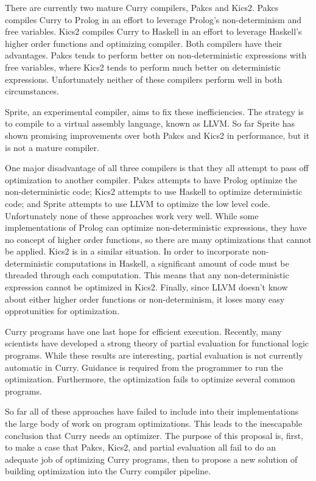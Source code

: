 There are currently two mature Curry compilers, Pakcs and Kics2.
Pakcs compiles Curry to Prolog in an effort to leverage Prolog's non-determinism and free variables.
Kics2 compiles Curry to Haskell in an effort to leverage Haskell's higher order functions and optimizing compiler.
Both compilers have their advantages.  Pakcs tends to perform better on non-deterministic expressions with free variables,
where Kics2 tends to perform much better on deterministic expressions.
Unfortunately neither of these compilers perform well in both circumstances.

Sprite, an experimental compiler, aims to fix these inefficiencies.
The strategy is to compile to a virtual assembly language, known as LLVM.
So far Sprite has shown promising improvements over both Pakcs and Kics2 in performance,
but it is not a mature compiler.

One major disadvantage of all three compilers is that they all attempt to pass off optimization to another compiler.
Pakcs attempts to have Prolog optimize the non-deterministic code; Kics2 attempts to use Haskell to optimize
deterministic code; and Sprite attempts to use LLVM to optimize the low level code.
Unfortunately none of these approaches work very well.
While some implementations of Prolog can optimize non-deterministic expressions, they have no concept of higher order functions,
so there are many optimizations that cannot be applied.
Kics2 is in a similar situation.  
In order to incorporate non-deterministic computations in Haskell, 
a significant amount of code must be threaded through each computation.
This means that any non-deterministic expression cannot be optimized in Kics2.
Finally, since LLVM doesn't know about either higher order functions or non-determinism, it loses many easy opprotunities for optimization.

Curry programs have one last hope for efficient execution.
Recently, many scientists \cite{peval_bjorn, offline_peval_Ramos} 
have developed a strong theory of partial evaluation for functional logic programs.
While these results are interesting, partial evaluation is not currently automatic in Curry.
Guidance is required from the programmer to run the optimization.
Furthermore, the optimization fails to optimize several common programs.

So far all of these approaches have failed to include into their implementations the large body of work on program optimizations.
This leads to the inescapable conclusion that Curry needs an optimizer.
The purpose of this proposal is, first, to make a case that Pakcs, Kics2, and partial evaluation all fail to do an adequate job
of optimizing Curry programs, then to propose a new solution of building optimization into the Curry compiler pipeline.

